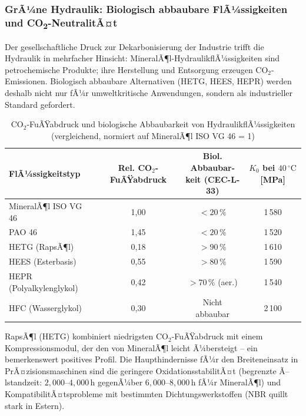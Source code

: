 ﻿\documentclass[a4paper,12pt]{scrreprt}
\theoremstyle{definition}
\begin{document}
\subsubsection{GrÃ¼ne Hydraulik: Biologisch abbaubare FlÃ¼ssigkeiten und CO\textsubscript{2}-NeutralitÃ¤t}

Der gesellschaftliche Druck zur Dekarbonisierung der Industrie
trifft die Hydraulik in mehrfacher Hinsicht: MineralÃ¶l-Hydraulik\-flÃ¼ssigkeiten
sind petrochemische Produkte; ihre Herstellung und Entsorgung erzeugen
CO$_2$-Emissionen. Biologisch abbaubare Alternativen (HETG, HEES, HEPR)
werden deshalb nicht nur fÃ¼r umweltkritische Anwendungen, sondern
als industrieller Standard gefordert.

\begin{table}[H]
  \centering
  \caption{CO$_2$-FuÃŸabdruck und biologische Abbaubarkeit von HydraulikflÃ¼ssigkeiten
    (vergleichend, normiert auf MineralÃ¶l ISO VG 46 = 1)}
  \label{tab:co2_hydraulik}
  \begin{tabular}{lccc}
    \toprule
    \textbf{FlÃ¼ssigkeitstyp}
      & \makecell{\textbf{Rel. CO$_2$-}\\\textbf{FuÃŸabdruck}}
      & \makecell{\textbf{Biol. Abbaubar-}\\\textbf{keit (CEC-L-33)}}
      & \makecell{\textbf{$K_0$ bei $40\,{^\circ}\mathrm{C}$}\\\textbf{[MPa]}} \\
    \midrule
    MineralÃ¶l ISO VG 46     & 1{,}00 & $<20\,\%$         & 1\,580 \\
    PAO 46                  & 1{,}45 & $<20\,\%$         & 1\,520 \\
    HETG (RapsÃ¶l)           & 0{,}18 & $>90\,\%$         & 1\,610 \\
    HEES (Esterbasis)       & 0{,}55 & $>80\,\%$         & 1\,590 \\
    HEPR (Polyalkylenglykol)& 0{,}42 & $>70\,\%$ (aer.)  & 1\,540 \\
    HFC (Wasserglykol)      & 0{,}30 & Nicht abbaubar    & 2\,100 \\
    \bottomrule
  \end{tabular}
\end{table}

RapsÃ¶l (HETG) kombiniert niedrigsten CO$_2$-FuÃŸabdruck mit einem
Kompressionsmodul, der den von MineralÃ¶l leicht Ã¼bersteigt -- ein
bemerkenswert positives Profil. Die Haupthindernisse fÃ¼r den
Breiteneinsatz in PrÃ¤zisionsmaschinen sind die geringere Oxidations\-stabilitÃ¤t
(begrenzte Ã–lstandzeit: $2{,}000$--$4{,}000\,\mathrm{h}$ gegenÃ¼ber
$6{,}000$--$8{,}000\,\mathrm{h}$ fÃ¼r MineralÃ¶l) und KompatibilitÃ¤ts\-probleme
mit bestimmten Dichtungswerkstoffen (NBR quillt stark in Estern).
\end{document}
